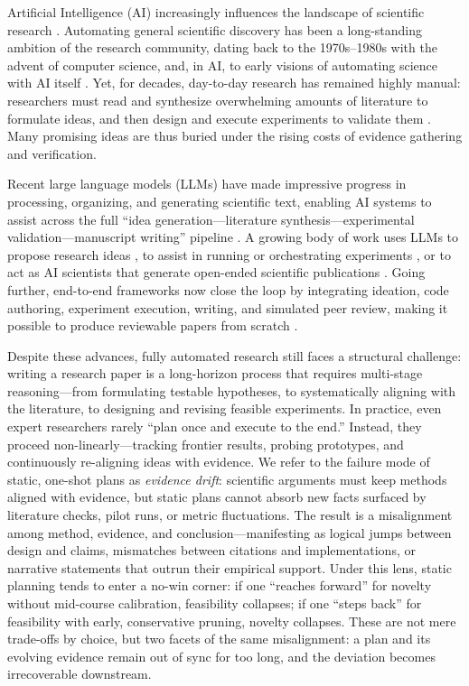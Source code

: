 \documentclass[manuscript,review,anonymous]{acmart}
\begin{document}
Artificial Intelligence (AI) increasingly influences the landscape of scientific research \cite{gil2014amplify,wang2023scientific}. Automating general scientific discovery has been a long-standing ambition of the research community, dating back to the 1970s–1980s \cite{langley1987scientific} with the advent of computer science, and, in AI, to early visions of automating science with AI itself \cite{hutter2001towards}. Yet, for decades, day-to-day research has remained highly manual: researchers must read and synthesize overwhelming amounts of literature to formulate ideas, and then design and execute experiments to validate them \cite{baek2025researchagent}. Many promising ideas are thus buried under the rising costs of evidence gathering and verification.

Recent large language models (LLMs) \cite{achiam2023gpt} have made impressive progress in processing, organizing, and generating scientific text, enabling AI systems to assist across the full “idea generation—literature synthesis—experimental validation—manuscript writing” pipeline \cite{wang2023scientific}. A growing body of work uses LLMs to propose research ideas \cite{wang2023scimon,yang2024large,baek2025researchagent}, to assist in running or orchestrating experiments \cite{du2024llms}, or to act as AI scientists that generate open-ended scientific publications \cite{lu2024ai,yamada2025ai}. Going further, end-to-end frameworks now close the loop by integrating ideation, code authoring, experiment execution, writing, and simulated peer review, making it possible to produce reviewable papers from scratch \cite{weng2025cycleresearcher}.

Despite these advances, fully automated research still faces a structural challenge: writing a research paper is a long-horizon process that requires multi-stage reasoning—from formulating testable hypotheses, to systematically aligning with the literature, to designing and revising feasible experiments. In practice, even expert researchers rarely “plan once and execute to the end.” Instead, they proceed non-linearly—tracking frontier results, probing prototypes, and continuously re-aligning ideas with evidence. We refer to the failure mode of static, one-shot plans as \emph{evidence drift}: scientific arguments must keep methods aligned with evidence, but static plans cannot absorb new facts surfaced by literature checks, pilot runs, or metric fluctuations. The result is a misalignment among method, evidence, and conclusion—manifesting as logical jumps between design and claims, mismatches between citations and implementations, or narrative statements that outrun their empirical support. Under this lens, static planning tends to enter a no-win corner: if one “reaches forward” for novelty without mid-course calibration, feasibility collapses; if one “steps back” for feasibility with early, conservative pruning, novelty collapses. These are not mere trade-offs by choice, but two facets of the same misalignment: a plan and its evolving evidence remain out of sync for too long, and the deviation becomes irrecoverable downstream.
\end{document}
